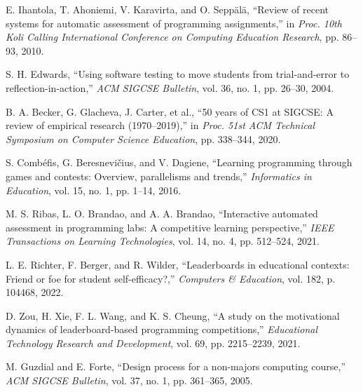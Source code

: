 \documentclass[12pt,a4paper]{article}
\begin{document}
\begin{enumerate}[label={[\arabic*]}, leftmargin=1.8em, itemsep=0pt, parsep=0pt]
    \item E. Ihantola, T. Ahoniemi, V. Karavirta, and O. Seppälä, ``Review of recent systems for automatic assessment of programming assignments,'' in \textit{Proc. 10th Koli Calling International Conference on Computing Education Research}, pp. 86--93, 2010.
    \item S. H. Edwards, ``Using software testing to move students from trial-and-error to reflection-in-action,'' \textit{ACM SIGCSE Bulletin}, vol. 36, no. 1, pp. 26--30, 2004.
    \item B. A. Becker, G. Glacheva, J. Carter, et al., ``50 years of CS1 at SIGCSE: A review of empirical research (1970--2019),'' in \textit{Proc. 51st ACM Technical Symposium on Computer Science Education}, pp. 338--344, 2020.
    \item S. Combéfis, G. Beresnevičius, and V. Dagiene, ``Learning programming through games and contests: Overview, parallelisms and trends,'' \textit{Informatics in Education}, vol. 15, no. 1, pp. 1--14, 2016.
    \item M. S. Ribas, L. O. Brandao, and A. A. Brandao, ``Interactive automated assessment in programming labs: A competitive learning perspective,'' \textit{IEEE Transactions on Learning Technologies}, vol. 14, no. 4, pp. 512--524, 2021.
    \item L. E. Richter, F. Berger, and R. Wilder, ``Leaderboards in educational contexts: Friend or foe for student self-efficacy?,'' \textit{Computers \& Education}, vol. 182, p. 104468, 2022.
    \item D. Zou, H. Xie, F. L. Wang, and K. S. Cheung, ``A study on the motivational dynamics of leaderboard-based programming competitions,'' \textit{Educational Technology Research and Development}, vol. 69, pp. 2215--2239, 2021.
    \item M. Guzdial and E. Forte, ``Design process for a non-majors computing course,'' \textit{ACM SIGCSE Bulletin}, vol. 37, no. 1, pp. 361--365, 2005.
\end{enumerate}
\end{document}
